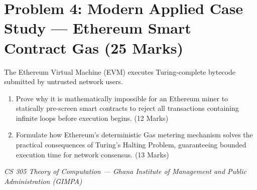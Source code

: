\documentclass[11pt,a4paper]{article}
\begin{document}
\vspace{8pt}

\section*{Problem 4: Modern Applied Case Study --- Ethereum Smart Contract Gas (25 Marks)}
The Ethereum Virtual Machine (EVM) executes Turing-complete bytecode submitted by untrusted network users.
\begin{enumerate}[label=\textbf{(\alph*)}]
    \item Prove why it is mathematically impossible for an Ethereum miner to statically pre-screen smart contracts to reject all transactions containing infinite loops before execution begins. (12 Marks)
    \item Formulate how Ethereum's deterministic Gas metering mechanism solves the practical consequences of Turing's Halting Problem, guaranteeing bounded execution time for network consensus. (13 Marks)
\end{enumerate}

\vfill
\begin{center}
    \small\color{darkgray}
    \textit{CS 305 Theory of Computation --- Ghana Institute of Management and Public Administration (GIMPA)}
\end{center}
\end{document}
